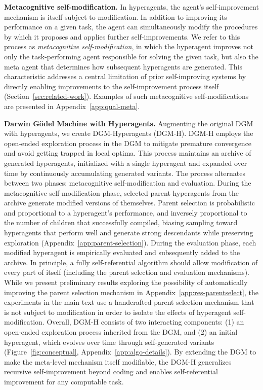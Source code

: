 \textbf{Metacognitive self-modification.} In hyperagents, the agent's self-improvement mechanism is itself subject to modification. In addition to improving its performance on a given task, the agent can simultaneously modify the procedures by which it proposes and applies further self-improvements. We refer to this process as \textit{metacognitive self-modification}, in which the hyperagent improves not only the task-performing agent responsible for solving the given task, but also the meta agent that determines how subsequent hyperagents are generated. This characteristic addresses a central limitation of prior self-improving systems \citep{zhang2025darwin, wang2025huxley} by directly enabling improvements to the self-improvement process itself (Section~\ref{sec:related-work}). Examples of such metacognitive self-modifications are presented in Appendix~\ref{app:qual-meta}.

\textbf{Darwin G\"{o}del Machine with Hyperagents.}
Augmenting the original DGM \citep{zhang2025darwin} with hyperagents, we create DGM-Hyperagents (DGM-H). DGM-H employs the open-ended exploration process in the DGM to mitigate premature convergence and avoid getting trapped in local optima. This process maintains an archive of generated hyperagents, initialized with a single hyperagent and expanded over time by continuously accumulating generated variants. The process alternates between two phases: metacognitive self-modification and evaluation. During the metacognitive self-modification phase, selected parent hyperagents from the archive generate modified versions of themselves. Parent selection is probabilistic and proportional to a hyperagent's performance, and inversely proportional to the number of children that successfully compiled, biasing sampling toward hyperagents that perform well and generate strong descendants while preserving exploration (Appendix~\ref{app:parent-selection}). During the evaluation phase, each modified hyperagent is empirically evaluated and subsequently added to the archive. In principle, a fully self-referential algorithm should allow modification of every part of itself (including the parent selection and evaluation mechanisms). While we present preliminary results exploring the possibility of automatically improving the parent selection mechanism in Appendix~\ref{app:res-parentselect}, the experiments in the main text use a handcrafted parent selection mechanism that is not subject to modification in order to isolate the effects of hyperagent self-modification. Overall, DGM-H consists of two interacting components: (1) an open-ended exploration process inherited from the DGM, and (2) an initial hyperagent, which evolves over time through self-generated variants (Figure~\ref{fig:conceptual}, Appendix~\ref{app:algo-details}). By extending the DGM to make the meta-level mechanism itself modifiable, the DGM-H generalizes recursive self-improvement beyond coding and enables self-referential improvement for any computable task.


